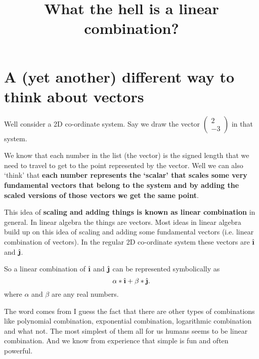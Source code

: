\documentclass[12pt]{article}
\title{What the hell is a linear combination?}
\author{}
\newcommand{\comment}[1]{}
\newcommand{\ihat}{\hat{\textbf{\i}}}
\newcommand{\jhat}{\hat{\textbf{\j}}}
\begin{document}
\maketitle

\section{A (yet another) different way to think about vectors}
Well consider a 2D co-ordinate system. Say we draw the vector $ \comment{Column-Vector: 2, -3} \begin{pmatrix} 2 \\  -3 \end{pmatrix} $ in that system.

\begin{figure}[h]
  \centering
\end{figure}

We know that each number in the list (the vector) is the signed length that we need to travel to get to the point represented by the vector.
Well we can also `think' that \textbf{each number represents the `scalar' that scales some very fundamental vectors that belong to the system and by adding the scaled versions of those vectors we get the same point}.

This idea of \textbf{scaling and adding things is known as linear combination} in general. In linear algebra the things are vectors. Most ideas in linear algebra build up on this idea of scaling and adding some fundamental vectors (i.e. linear combination of vectors). In the regular 2D co-ordinate system these vectors are $ \ihat $ and $ \jhat $.

So a linear combination of $ \ihat $ and $ \jhat $ can be represented symbolically as \[
\alpha * \ihat + \beta * \jhat
.\] where $ \alpha $ and $ \beta $ are any real numbers.

The word comes from I guess the fact that there are other types of combinations like polynomial combination, exponential combination, logarithmic combination and what not. The most simplest of them all for us humans seems to be linear combination. And we know from experience that simple is fun and often powerful.
\end{document}
